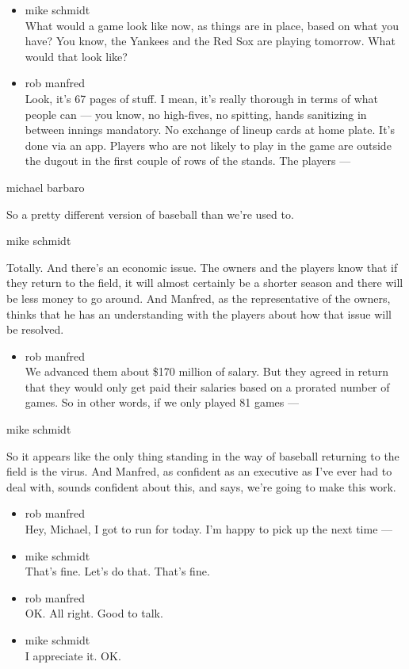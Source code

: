 \begin{itemize}
\item
  mike schmidt\\
  What would a game look like now, as things are in place, based on what
  you have? You know, the Yankees and the Red Sox are playing tomorrow.
  What would that look like?
\item
  rob manfred\\
  Look, it's 67 pages of stuff. I mean, it's really thorough in terms of
  what people can --- you know, no high-fives, no spitting, hands
  sanitizing in between innings mandatory. No exchange of lineup cards
  at home plate. It's done via an app. Players who are not likely to
  play in the game are outside the dugout in the first couple of rows of
  the stands. The players ---
\end{itemize}

michael barbaro

So a pretty different version of baseball than we're used to.

mike schmidt

Totally. And there's an economic issue. The owners and the players know
that if they return to the field, it will almost certainly be a shorter
season and there will be less money to go around. And Manfred, as the
representative of the owners, thinks that he has an understanding with
the players about how that issue will be resolved.

\begin{itemize}
\tightlist
\item
  rob manfred\\
  We advanced them about \$170 million of salary. But they agreed in
  return that they would only get paid their salaries based on a
  prorated number of games. So in other words, if we only played 81
  games ---
\end{itemize}

mike schmidt

So it appears like the only thing standing in the way of baseball
returning to the field is the virus. And Manfred, as confident as an
executive as I've ever had to deal with, sounds confident about this,
and says, we're going to make this work.

\begin{itemize}
\item
  rob manfred\\
  Hey, Michael, I got to run for today. I'm happy to pick up the next
  time ---
\item
  mike schmidt\\
  That's fine. Let's do that. That's fine.
\item
  rob manfred\\
  OK. All right. Good to talk.
\item
  mike schmidt\\
  I appreciate it. OK.
\end{itemize}

